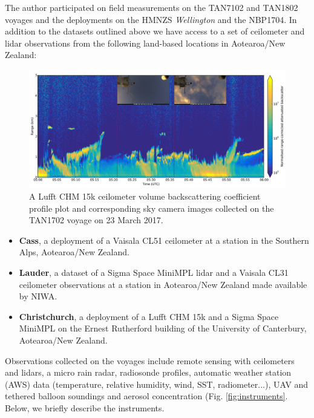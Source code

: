\noindent
The author participated on field measurements on the TAN7102 and TAN1802 voyages and the deployments
on the HMNZS \textit{Wellington} and the NBP1704.
In addition to the datasets outlined above we have access to a set of
ceilometer and lidar observations from the following land-based locations in
Aotearoa/New Zealand:

\begin{figure}[t]
\includegraphics[width=\textwidth]{fig/chm15k_profile.png}
\caption[Lufft CHM 15k ceilometer volume backscattering coefficient profile plot]{
A Lufft CHM 15k ceilometer volume backscattering coefficient profile plot
and corresponding sky camera images collected on the TAN1702 voyage
on 23 March 2017.
}
\label{fig:chm15k-profile}
\end{figure}

\begin{itemize}
\item \textbf{Cass}, a deployment of a Vaisala CL51 ceilometer at a station in the
Southern Alps, Aotearoa/New Zealand.
\item \textbf{Lauder}, a dataset of a Sigma Space MiniMPL lidar and a Vaisala CL31
ceilometer observations at a station in Aotearoa/New Zealand made available by NIWA.
\item \textbf{Christchurch}, a deployment of a Lufft CHM 15k and a Sigma Space MiniMPL on the
Ernest Rutherford building of the University of Canterbury, Aotearoa/New
Zealand.
\end{itemize}

Observations collected on the voyages include remote sensing with ceilometers and lidars,
a micro rain radar, radiosonde profiles, automatic weather station (AWS) data (temperature, relative humidity,
wind, SST, radiometer...), UAV and tethered balloon soundings and
aerosol concentration (Fig. \ref{fig:instruments}.
Below, we briefly describe the instruments.


